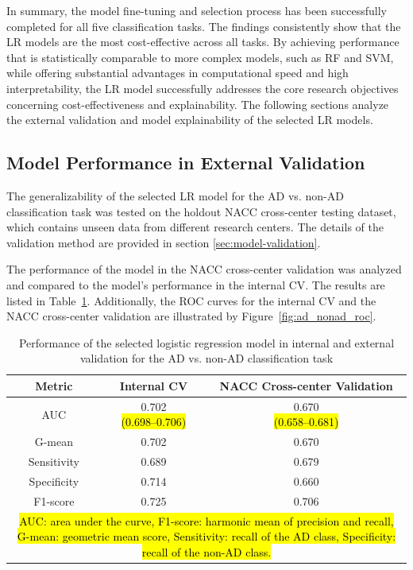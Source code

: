 In summary, the model fine-tuning and selection process has been successfully completed for all five classification tasks. The findings consistently show that the LR models are the most cost-effective across all tasks. By achieving performance that is statistically comparable to more complex models, such as RF and SVM, while offering substantial advantages in computational speed and high interpretability, the LR model successfully addresses the core research objectives concerning cost-effectiveness and explainability. The following sections analyze the external validation and model explainability of the selected LR models.

\subsection{Model Performance in External Validation}
The generalizability of the selected LR model for the AD vs. non-AD classification task was tested on the holdout NACC cross-center testing dataset, which contains unseen data from different research centers. The details of the validation method are provided in section \ref{sec:model-validation}.

The performance of the model in the NACC cross-center validation was analyzed and compared to the model's performance in the internal CV. The results are listed in Table~\ref{tab:ad_nonad_results}. Additionally, the ROC curves for the internal CV and the NACC cross-center validation are illustrated by Figure~\ref{fig:ad_nonad_roc}.

\begin{table}[!ht]
    \centering
    \caption{Performance of the selected logistic regression model in internal and external validation for the AD vs. non-AD classification task}
    \label{tab:ad_nonad_results}
    \begin{tabular}{|c|c|c|}
        \hline
        \textbf{Metric} & \textbf{Internal CV} & \textbf{NACC Cross-center Validation} \\
        \hline
        AUC & \makecell{0.702 \\ {\small \hl{(0.698--0.706)}}} & \makecell{0.670 \\ {\small \hl{(0.658--0.681)}}} \\ \hline
        G-mean & 0.702 & 0.670 \\ \hline
        Sensitivity & 0.689 & 0.679 \\ \hline
        Specificity & 0.714 & 0.660 \\ \hline
        F1-score & 0.725 & 0.706 \\
        \hline
        \multicolumn{3}{p{400pt}}{\footnotesize \hl{AUC: area under the curve, F1-score: harmonic mean of precision and recall, G-mean: geometric mean score, Sensitivity: recall of the AD class, Specificity: recall of the non-AD class.}}
    \end{tabular}
\end{table}

